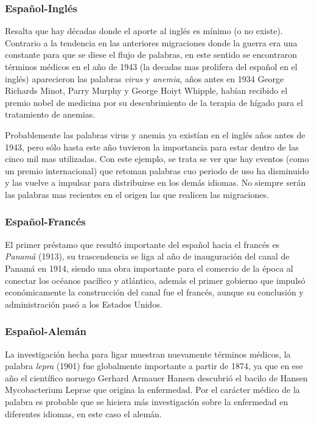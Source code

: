 {\subsubsection*{Español-Inglés}%

Resalta que hay décadas donde el aporte al inglés es mínimo (o no existe). Contrario a la tendencia en las anteriores migraciones donde la guerra era una constante para que se diese el flujo de palabras, en este sentido se encontraron términos médicos en el año de 1943 (la decadas mas prolifera del español en el inglés) aparecieron las palabras \textit{virus} y \textit{anemia}, años antes en 1934 George Richards Minot, Parry Murphy y George Hoiyt Whipple, habían recibido el premio nobel de medicina por su descubrimiento de la terapia de hígado para el tratamiento de anemias.   

Probablemente las palabras virus y anemia ya existían en el inglés años antes de 1943,  pero sólo hasta este año tuvieron la importancia para estar dentro de las cinco mil mas utilizadas. Con este ejemplo, se trata se ver que hay eventos (como un premio internacional) que retoman palabras cuo periodo de uso  ha disminuido y las vuelve a impulsar para distribuirse en los demás idiomas.   No siempre serán las palabras mas recientes en el origen las que realicen las migraciones. 

\subsubsection*{Español-Francés}%

El primer préstamo que resultó importante del español hacia el francés es \textit{Panamá} (1913), su trascendencia se liga al año de inauguración del canal de Panamá en 1914, siendo una obra importante para el comercio de la época al conectar los océanos pacífico y atlántico, además el primer gobierno que impulsó económicamente la construcción del canal fue el francés,  aunque su conclusión y administración pasó a los Estados Unidos.  




\subsubsection*{Español-Alemán}%


La investigación hecha para ligar muestran nuevamente términos médicos, la palabra \textit{lepra} (1901) fue globalmente importante a partir de 1874,  ya que en ese año el científico noruego Gerhard Armauer Hansen descubrió el bacilo de Hansen Mycobacterium Leprae \cite{lepra} que origina la enfermedad. Por el carácter médico de la palabra es probable que se hiciera más investigación sobre la enfermedad en diferentes idiomas, en este caso el alemán.

}

